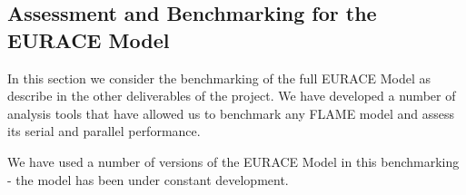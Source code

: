 \subsection{Assessment and Benchmarking for the EURACE Model}
\label{sec:benchmarks}
In this section we consider the benchmarking of the full EURACE Model as
describe in the other deliverables of the project. We have developed a
number of analysis tools that have allowed us to benchmark any
FLAME model and assess its serial and parallel performance.

We have used a number of versions of the EURACE Model in this benchmarking - the model
has been under constant development.
